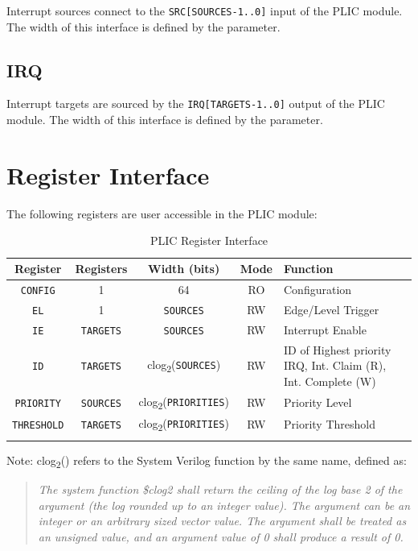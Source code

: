 Interrupt sources connect to the \texttt{SRC{[}SOURCES-1..0{]}} input of
the PLIC module. The width of this interface is defined by the \texttt{} parameter. 

\subsection{IRQ}

Interrupt targets are sourced by the \texttt{IRQ{[}TARGETS-1..0{]}}
output of the PLIC module. The width of this interface is defined by the
\texttt{} parameter.

\section{Register Interface}

The following registers are user accessible in the PLIC module:

\begin{longtable}[c]{@{\extracolsep{\fill}}ccccp{5cm}@{\extracolsep{\fill}}}	
	\toprule 
	\textbf{Register}  & \textbf{Registers} & \textbf{Width (bits)} & \textbf{Mode} & \textbf{Function} \\
	\midrule 
	\endhead
	\texttt{CONFIG}    & 1 & 64 & RO & Configuration\\
	\texttt{EL}        & 1 & \texttt{SOURCES} & RW & Edge/Level Trigger\\
	\texttt{IE}        & \texttt{TARGETS} & \texttt{SOURCES} & RW & Interrupt Enable\\
	\texttt{ID}        & \texttt{TARGETS} & clog\textsubscript{2}(\texttt{SOURCES}) & RW & ID of Highest priority IRQ, \newline Int. Claim (R), \newline Int. Complete (W)\\
	\texttt{PRIORITY}  & \texttt{SOURCES} & clog\textsubscript{2}(\texttt{PRIORITIES}) & RW & Priority Level\\
	\texttt{THRESHOLD} & \texttt{TARGETS} & clog\textsubscript{2}(\texttt{PRIORITIES}) & RW & Priority Threshold \\
	\bottomrule 	

\caption{PLIC Register Interface}
\label{tab:REGIF2}
\end{longtable}

Note: clog\textsubscript{2}() refers to the System Verilog function by
the same name, defined as:

\begin{quote}
\emph{The system function \$clog2 shall return the ceiling of the log
base 2 of the argument (the log rounded up to an integer value). The
argument can be an integer or an arbitrary sized vector value. The
argument shall be treated as an unsigned value, and an argument value of
0 shall produce a result of 0.}
\end{quote}

